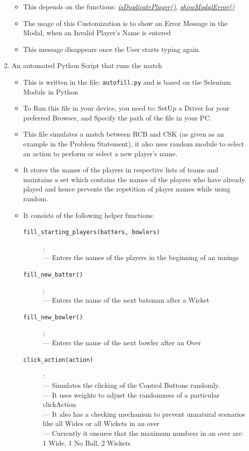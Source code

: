 \documentclass[a4paper,12pt]{article}
\begin{document}
\begin{enumerate}
  \begin{itemize}
  \item This depends on the functions: \hyperref[error1]{\textit{isDuplicatePlayer()}}, \hyperref[error2]{\textit{showModalError()}}
  \item The usage of this Customization is to show an Error Message in the Modal, when an Invalid Player's Name is entered
  \item This message disappears once the User starts typing again.
  \end{itemize}
\item An automated Python Script that runs the match
  \begin{itemize}
  \item This is written in the file: \texttt{autofill.py} and is based on the Selenium Module in Python
  \item To Run this file in your device, you need to: SetUp a Driver for your preferred Browser, and Specify the path of the file in your PC.
  \item This file simulates a match between RCB and CSK (as given as an example in the Problem Statement), it also uses random module to select an action to perform or select a new player's name.
  \item It stores the names of the players in respective lists of teams and maintains a set which contains the names of the players who have already played and hence prevents the repetition of player names while using random.
  \item It consists of the following helper functions:
    \begin{description}
      \item [\texttt{fill\_starting\_players(batters, bowlers)}]: \\ --- Enters the names of the players in the beginning of an innings
      \item [\texttt{fill\_new\_batter()}]: \\ --- Enters the name of the next batsman after a Wicket
      \item [\texttt{fill\_new\_bowler()}]: \\ --- Enters the name of the next bowler after an Over
      \item [\texttt{click\_action(action)}]: \\ --- Simulates the clicking of the Control Buttons randomly. \\ --- It uses weights to adjust the randomness of a particular clickAction \\ --- It also has a checking mechanism to prevent unnatural scenarios like \hspace*{0.45cm} all Wides or all Wickets in an over \\ --- Currently it ensures that the maximum numbers in an over are: \\ \hspace*{0.45cm} 1 Wide, 1 No Ball, 2 Wickets

\end{description}
\end{itemize}
\end{enumerate}
\end{document}
